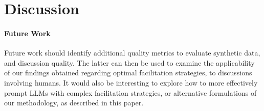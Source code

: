 %
\section{Discussion}
\paragraph{Future Work}Future work should identify additional quality metrics to evaluate synthetic data, and discussion quality. The latter can then be used to examine the applicability of our findings obtained regarding optimal facilitation strategies, to discussions involving humans. It would also be interesting to explore how to more effectively prompt LLMs with complex facilitation strategies, or alternative formulations of our methodology, as described in this paper.